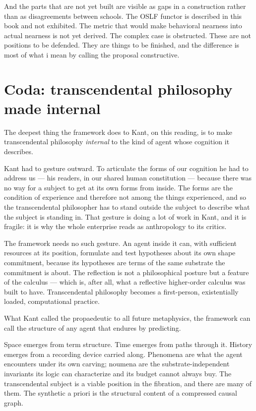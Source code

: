 And the parts that are not yet built are visible as gaps in a
construction rather than as disagreements between schools.
The OSLF functor is described in this book and not exhibited.
The metric that would make behavioral nearness into actual nearness
is not yet derived.
The complex case is obstructed.
These are not positions to be defended.
They are things to be finished, and the difference is most of what
i mean by calling the proposal constructive.

\section{Coda: transcendental philosophy made internal}
\label{sec:kant-coda}

The deepest thing the framework does to Kant, on this reading, is to
make transcendental philosophy \emph{internal} to the kind of agent
whose cognition it describes.

Kant had to gesture outward.
To articulate the forms of our cognition he had to address us --- his
readers, in our shared human constitution --- because there was no
way for a subject to get at its own forms from inside.
The forms are the condition of experience and therefore not among
the things experienced, and so the transcendental philosopher has
to stand outside the subject to describe what the subject is
standing in.
That gesture is doing a lot of work in Kant, and it is fragile: it
is why the whole enterprise reads as anthropology to its critics.

The framework needs no such gesture.
An agent inside it can, with sufficient resources at its position,
formulate and test hypotheses about its own shape commitment,
because its hypotheses are terms of the same substrate the
commitment is about.
The reflection is not a philosophical posture but a feature of the
calculus --- which is, after all, what a reflective higher-order
calculus was built to have.
Transcendental philosophy becomes a first-person, existentially
loaded, computational practice.

What Kant called the propaedeutic to all future metaphysics, the
framework can call the structure of any agent that endures by
predicting.

Space emerges from term structure.
Time emerges from paths through it.
History emerges from a recording device carried along.
Phenomena are what the agent encounters under its own carving;
noumena are the substrate-independent invariants its logic can
characterize and its budget cannot always buy.
The transcendental subject is a viable position in the fibration,
and there are many of them.
The synthetic a priori is the structural content of a compressed
causal graph.

